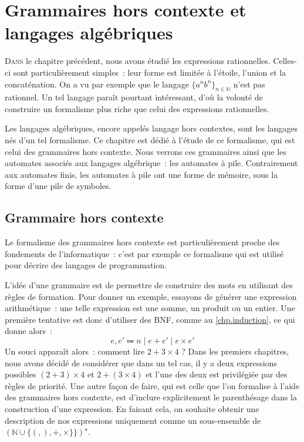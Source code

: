 \chapter[Langages algébriques]{Grammaires hors contexte et langages algébriques}
\label{chp.alg}

\minitoc

\lettrine{D}{ans} le chapitre précédent, nous avons étudié les expressions
rationnelles. Celles-ci sont particulièrement simples~: leur forme est limitée
à l'étoile, l'union et la concaténation. On a vu par exemple que le langage
$\{a^nb^n\}_{n\in\mathbb N}$ n'est pas rationnel. Un tel langage paraît pourtant
intéressant, d'où la volonté de construire un formalisme plus riche que celui
des expressions rationnelles.

Les langages algébriques, encore appelés langage hors contextes, sont les
langages nés d'un tel formalisme. Ce chapitre est dédié à l'étude de ce
formalisme, qui est celui des grammaires hors contexte. Nous verrons ces
grammaires ainsi que les automates associés aux langages algébrique~: les
automates à pile. Contrairement aux automates finis, les automates à pile ont
une forme de mémoire, sous la forme d'une pile de symboles.

\section{Grammaire hors contexte}\label{sec.alg1}

Le formalisme des grammaires hors contexte est particulièrement proche des
fondements de l'informatique~: c'est par exemple ce formalisme qui est utilisé
pour décrire des langages de programmation.

L'idée d'une grammaire est de permettre de construire des mots en utilisant des
règles de formation. Pour donner un exemple, essayons de générer une expression
arithmétique~: une telle expression est une somme, un produit ou un entier. Une
première tentative est donc d'utiliser des BNF, comme au \cref{chp.induction},
ce qui donne alors~:
\[e,e' \Coloneq n \mid e + e' \mid e \times e'\]
Un souci apparaît alors~: comment lire $2 + 3 \times 4$ ? Dans les premiers
chapitres, nous avons décidé de considérer que dans un tel cas, il y a deux
expressions possibles $(2 + 3) \times 4$ et $2 + (3 \times 4)$ et l'une des deux
est privilégiée par des règles de priorité. Une autre façon de faire, qui est
celle que l'on formalise à l'aide des grammaires hors contexte, est d'inclure
explicitement le parenthésage dans la construction d'une expression. En faisant
cela, on souhaite obtenir une description de nos expressions uniquement comme
un sous-ensemble de $(\mathbb N \cup \{(,),+,\times\}\})^\star$.

